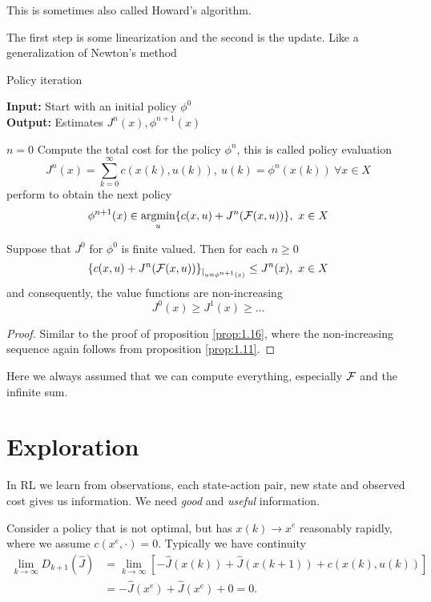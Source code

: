 This is sometimes also called Howard's algorithm.

\begin{remark}
    The first step is some linearization and the second is the update. Like a generalization of Newton's method    
\end{remark}

\begin{algorithm}[H]
    \caption{Policy iteration}
    \textbf{Input:} Start with an initial policy \(\phi^0\)\\
    \textbf{Output:} Estimates \(J^n(x), \phi^{n+1}(x)\)
    \begin{algorithmic}
    \State \(n=0\)
        \State Compute the total cost for the policy \(\phi^n\), this is called policy evaluation
            \[J^n(x)=\sum_{k=0}^\infty c(x(k),u(k)),\ u(k)=\phi^n(x(k))\ \forall x\in X\]
        \State perform  to obtain the next policy 
            \[\phi^{n+1}(x)\in \operatorname*{\text{argmin}}_{u}\{c(x,u)+J^n(\mathcal{F}(x,u))\},\ x\in X\]
    \EndWhile
    \end{algorithmic}
\end{algorithm}

\begin{proposition}\label{prop:1.17}
    Suppose that \(J^0\) for \(\phi^0\) is finite valued. Then 
    for each \(n\geq 0\)
    \[\{c(x,u)+J^n(\mathcal{F}(x,u))\}_{|_{u=\phi^{n+1}(x)}}\leq J^n(x),\ x\in X\]
    and consequently, the value functions are non-increasing
    \[J^0(x)\geq J^1(x)\geq \dots\]
\end{proposition}

\begin{proof}
    Similar to the proof of proposition \ref{prop:1.16}, where the non-increasing sequence again follows  
    from proposition \ref{prop:1.11}. 
\end{proof}

Here we always assumed that we can compute everything, especially \(\mathcal{F}\) and the infinite sum.

\section{Exploration}
In RL we learn from observations, each state-action pair,
new state and observed cost gives us information. We need 
\textit{good} and \textit{useful} information. 

Consider a policy that is not optimal, but has 
\(x(k)\to x^e\) reasonably rapidly, where we assume \(c(x^e,\cdot)=0\).
Typically we have continuity 
\begin{align*}
    \lim_{k\to \infty} D_{k+1}(\hat{J}) & = \lim_{k\to\infty} \left[
        -\hat{J}(x(k))+\hat{J}(x(k+1))+c(x(k),u(k))
    \right] \\
    &=-\hat{J}(x^e)+\hat{J}(x^e)+0=0. 
\end{align*}

